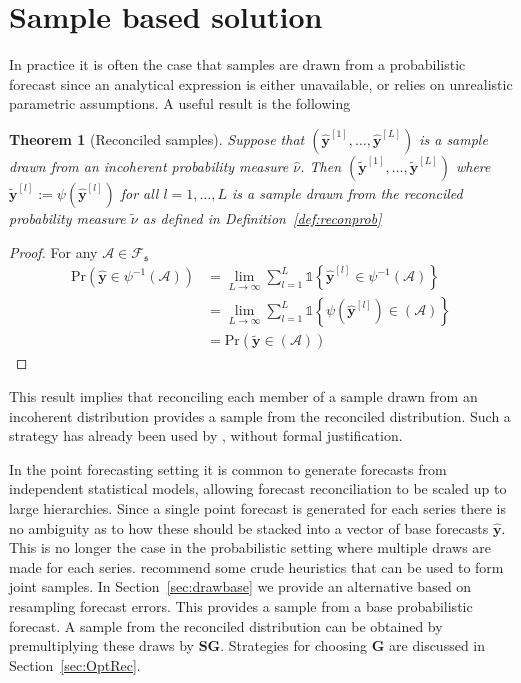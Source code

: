 \documentclass[12pt]{article}
\newtheorem{theo}{Theorem}[section]
\theoremstyle{definition}
\begin{document}
\section{Sample based solution}\label{sec:SampleSolution}

In practice it is often the case that samples are drawn from a probabilistic forecast since an analytical expression is either unavailable, or relies on unrealistic parametric assumptions.  A useful result is the following
\begin{theo}[Reconciled samples]
	Suppose that $\left(\hat{\bm y}^{[1]},\ldots,\hat{\bm y}^{[L]}\right)$ is a sample drawn from an incoherent probability measure $\hat{\nu}$.  Then $\left(\tilde{\bm y}^{[1]},\ldots,\tilde{\bm y}^{[L]}\right)$ where $\tilde{\bm y}^{[l]}:=\psi(\hat{\bm y}^{[l]})$ for all $l=1,\ldots,L$ is a sample drawn from the reconciled probability measure $\tilde{\nu}$ as defined in Definition~\ref{def:reconprob}
\end{theo}
\begin{proof}
	For any $\mathcal{A}\in\mathscr{F}_{\mathfrak{s}}$
\begin{align}
	\mbox{Pr}(\hat{{\bm y}}\in\psi^{-1}(\mathcal{A}))&=\underset{L\rightarrow\infty}{\lim}\sum\limits_{l=1}^L\mathbb{1}\left\{\hat{\bm y}^{[l]}\in\psi^{-1}(\mathcal{A})\right\}\nonumber\\
	&=\underset{L\rightarrow\infty}{\lim}\sum\limits_{l=1}^L\mathbb{1}\left\{\psi(\hat{\bm y}^{[l]})\in(\mathcal{A})\right\}\nonumber\\
	&=\mbox{Pr}(\tilde{{\bm y}}\in(\mathcal{A}))\nonumber
\end{align}
\end{proof}

This result implies that reconciling each member of a sample drawn from an incoherent distribution provides a sample from the reconciled distribution.  Such a strategy has already been used by \cite{JeoEtAl2019}, without formal justification.  

In the point forecasting setting it is common to generate forecasts from independent statistical models, allowing forecast reconciliation to be scaled up to large hierarchies.  Since a single point forecast is generated for each series there is no ambiguity as to how these should be stacked into a vector of base forecasts $\hat{\bm{y}}$.  This is no longer the case in the probabilistic setting where multiple draws are made for each series.  \cite{JeoEtAl2019} recommend some crude heuristics that can be used to form joint samples.  In Section~\ref{sec:drawbase} we provide an alternative based on resampling forecast errors. This provides a sample from a base probabilistic forecast. A sample from the reconciled distribution can be obtained by premultiplying these draws by $\bm{S}\bm{G}$. Strategies for choosing $\bm{G}$ are discussed in Section~\ref{sec:OptRec}.
\end{document}
